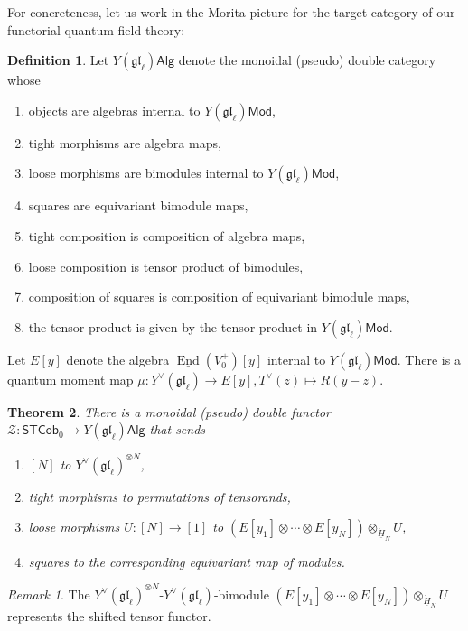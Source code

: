 \documentclass[11pt]{report}
\newtheorem{theorem}{Theorem}[section]
\theoremstyle{definition}
\newtheorem{definition}[theorem]{Definition}
\theoremstyle{remark}
\newtheorem*{remark}{Remark}
\theoremstyle{remark}
\begin{document}
For concreteness, let us work in the Morita picture for the target category of our functorial quantum field theory:

\begin{definition}
Let $Y(\mathfrak{gl}_\ell)\mathsf{Alg}$ denote the monoidal (pseudo) double category whose
\begin{enumerate}[label=(\roman*)]
\item objects are algebras internal to $Y(\mathfrak{gl}_\ell)\mathsf{Mod}$,
\item tight morphisms are algebra maps,
\item loose morphisms are bimodules internal to $Y(\mathfrak{gl}_\ell)\mathsf{Mod}$,
\item squares are equivariant bimodule maps,
\item tight composition is composition of algebra maps,
\item loose composition is tensor product of bimodules,
\item composition of squares is composition of equivariant bimodule maps,
\item the tensor product is given by the tensor product in $Y(\mathfrak{gl}_\ell)\mathsf{Mod}$.
\end{enumerate}
\end{definition}

Let $E[y]$ denote the algebra $\underline{\operatorname{End}}(V_0^+)[y]$ internal to $Y(\mathfrak{gl}_\ell)\mathsf{Mod}$. There is a quantum moment map $\mu: Y^\vee(\mathfrak{gl}_\ell) \to E[y], T^\vee(z) \mapsto R(y-z)$.

\begin{theorem}
There is a monoidal (pseudo) double functor $\mathcal{Z}: \mathsf{STCob}_0 \to Y(\mathfrak{gl}_\ell)\mathsf{Alg}$ that sends
\begin{enumerate}[label=(\roman*)]
\item $[N]$ to $Y^\vee(\mathfrak{gl}_\ell)^{\otimes N}$,
\item tight morphisms to permutations of tensorands,
\item loose morphisms $U: [N] \to [1]$ to $(E[y_1] \otimes \cdots \otimes E[y_N]) \otimes_{\underline{\dot H}_N} U$,
\item squares to the corresponding equivariant map of modules.
\end{enumerate}
\end{theorem}

\begin{remark}
The $Y^\vee(\mathfrak{gl}_\ell)^{\otimes N}$-$Y^\vee(\mathfrak{gl}_\ell)$-bimodule $(E[y_1] \otimes \cdots \otimes E[y_N]) \otimes_{\underline{\dot H}_N} U$ represents the shifted tensor functor.
\end{remark}
\end{document}
